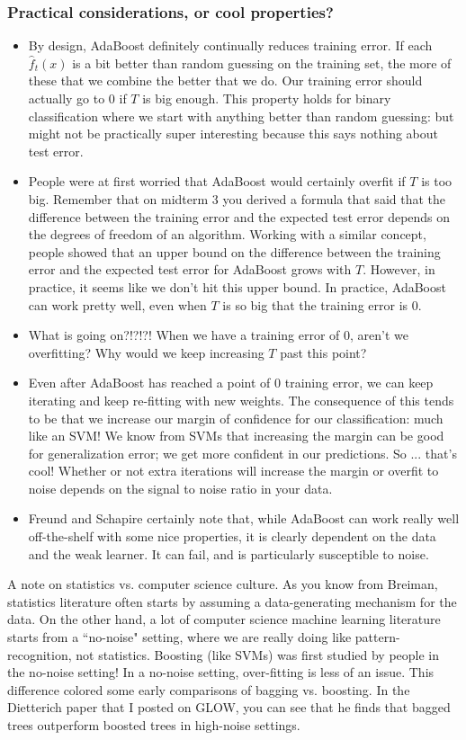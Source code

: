 \subsubsection{Practical considerations, or cool properties?}
\begin{itemize}
\item By design, AdaBoost definitely continually reduces training error. If each $\hat{f}_t(x)$ is a bit better than random guessing on the training set, the more of these that we combine the better that we do. Our training error should actually go to $0$ if $T$ is big enough. This property holds for binary classification where we start with anything better than random guessing: but might not be practically super interesting because this says nothing about test error. 
\item People were at first worried that AdaBoost would certainly overfit if $T$ is too big. Remember that on midterm 3 you derived a formula that said that the difference between the training error and the expected test error depends on the degrees of freedom of an algorithm. Working with a similar concept, people showed that an upper bound on the difference between the training error and the expected test error for AdaBoost grows with $T$. However, in practice, it seems like we don't hit this upper bound. In practice, AdaBoost can work pretty well, even when $T$ is so big that the training error is $0$. 
\item What is going on?!?!?! When we have a training error of $0$, aren't we overfitting? Why would we keep increasing $T$ past this point? 
\item Even after AdaBoost has reached a point of $0$ training error, we can keep iterating and keep re-fitting with new weights. The consequence of this tends to be that we increase our margin of confidence for our classification: much like an SVM! We know from SVMs that increasing the margin can be good for generalization error; we get more confident in our predictions. So ... that's cool! Whether or not extra iterations will increase the margin or overfit to noise depends on the signal to noise ratio in your data. 
\item Freund and Schapire certainly note that, while AdaBoost can work really well off-the-shelf with some nice properties, it is clearly dependent on the data and the weak learner. It can fail, and is particularly susceptible to noise. 
\end{itemize}


A note on statistics vs. computer science culture. As you know from Breiman, statistics literature often starts by assuming a data-generating mechanism for the data. On the other hand, a lot of computer science machine learning literature starts from a ``no-noise" setting, where we are really doing like pattern-recognition, not statistics. Boosting (like SVMs) was first studied by people in the no-noise setting! In a no-noise setting, over-fitting is less of an issue. This difference colored some early comparisons of bagging vs. boosting. In the Dietterich paper that I posted on GLOW, you can see that he finds that bagged trees outperform boosted trees in high-noise settings. 


